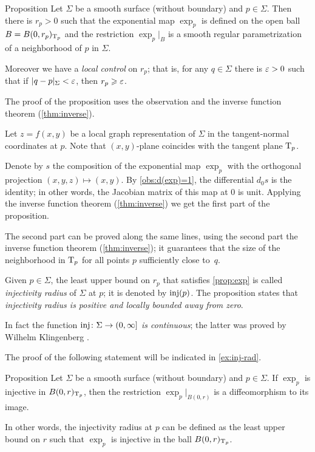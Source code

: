 \begin{thm}{Proposition}\label{prop:exp}
Let $\Sigma$ be a smooth surface (without boundary) and $p\in \Sigma$.
Then there is $r_p>0$ such that
the exponential map $\exp_p$ is defined on the open ball $B=B(0,r_p)_{\mathrm{T}_p}$
and the restriction $\exp_p|_B$ is a smooth regular parametrization of a neighborhood of $p$ in $\Sigma$.

Moreover we have a {}\emph{local control} on $r_p$;
that is, for any $q\in \Sigma$ there is $\varepsilon>0$ such that if $|q-p|_\Sigma<\varepsilon$, then $r_p\geqslant\varepsilon$.
\end{thm}

The proof of the proposition uses the observation and the inverse function theorem (\ref{thm:inverse}).

Let $z=f(x,y)$ be a local graph representation of $\Sigma$ in the tangent-normal coordinates at $p$.
Note that $(x,y)$-plane coincides with the tangent plane $\mathrm{T}_p$.

Denote by $s$ the composition of  the exponential map $\exp_p$ with the orthogonal projection $(x,y,z)\mapsto (x,y)$.
By \ref{obs:d(exp)=1}, the differential $d_0s$ is the identity;
in other words, the Jacobian matrix of this map at $0$ is unit.
Applying the inverse function theorem (\ref{thm:inverse}) we get the first part of the proposition.

The second part can be proved along the same lines, using the second part the inverse function theorem (\ref{thm:inverse});
it guarantees that the size of the neighborhood in $\mathrm{T}_p$ for all points $p$ sufficiently close to~$q$.
\qeds

Given $p\in \Sigma$, the least upper bound on $r_p$ that satisfies \ref{prop:exp} is called \emph{injectivity radius} of $\Sigma$ at $p$;
it is denoted by $\mathop{\rm inj}\nolimits(p)$.
The proposition states that {}\emph{injectivity radius is positive and locally bounded away from zero}.

In fact the function {}\emph{$\mathop{\rm inj}\nolimits\colon\Sigma\to (0,\infty]$ is continuous};
the latter was proved by Wilhelm Klingenberg \cite[5.4]{gromoll-klingenberg-meyer}. 

The proof of the following statement will be indicated in \ref{ex:inj-rad}.

\begin{thm}{Proposition}\label{prop:inj-rad}
Let $\Sigma$ be a smooth surface (without boundary) and $p\in \Sigma$.
If $\exp_p$ is injective in $B(0,r)_{\mathrm{T}_p}$, then the restriction $\exp_p|_{B(0,r)}$ is a diffeomorphism to its image.

In other words, the injectivity radius at $p$ can be defined as the least upper bound on $r$ such that $\exp_p$ is injective in the ball $B(0,r)_{\mathrm{T}_p}$.
\end{thm}

